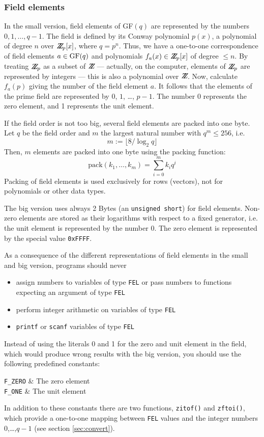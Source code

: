 {\subsubsection{Field elements}\label{sec:fel}
In the small version, field elements of GF$(q)$ are represented
by the numbers $0,1,\ldots,q-1$. The field is defined by its
Conway polynomial $p(x)$, a polynomial of degree $n$ over $Z\!\!\! Z\!_p[x]$,
where $q=p^n$. Thus, we have a one-to-one correspondence of field
elements $a\in{\rm GF}(q)$ and polynomials $f_a(x)\in Z\!\!\! Z\!_p[x]$ of
degree $\leq n$. By treating $Z\!\!\! Z\!_p$ as a subset of $Z\!\!\! Z\!$ ---
actually, on the computer, elements of $Z\!\!\! Z\!_p$ are represented
by integers --- this is also a polynomial over $Z\!\!\! Z\!$. Now,
calculate $f_a(p)$ giving the number of the field element $a$.
It follows that the elements of the prime field are represented by
$0$, $1$, \ldots, $p-1$. The number 0 represents the zero element,
and 1 represents the unit element.

If the field order is not too big, several field elements are packed
into one byte. Let $q$ be the field order and $m$ the largest natural
number with $q^m\leq 256$, i.e.
\[
	m := \lfloor 8/\log_2 q \rfloor
\]
Then, $m$ elements are packed into one byte using the
packing function:
\[
	\mbox{pack}(k_1,\ldots,k_m) = \sum_{i=0}^m k_iq^i
\]
Packing of field elements is used exclusively for rows (vectors),
not for polynomials or other data types.

The big version uses always 2 Bytes (an {\tt unsigned short}) for
field elements. Non-zero elements are stored as their logarithms with
respect to a fixed generator, i.e. the unit element is represented by
the number 0. The zero element is represented by
the special value {\tt 0xFFFF}.

As a consequence of the different representations of field elements
in the small and big version, programs should never
\begin{itemize}
\item	assign numbers to variables of type {\tt FEL} or pass numbers
        to functions expecting an argument of type {\tt FEL}
\item	perform integer arithmetic on variables of type {\tt FEL}
\item	{\tt printf} or {\tt scanf} variables of type {\tt FEL}
\end{itemize}
Instead of using the literals 0 and 1 for the zero and unit element in
the field, which would produce wrong results with the big version,
you should use the following predefined constants:
\begin{center}
\TABlp
\verb|F_ZERO| & The zero element \\
\verb|F_ONE| & The unit element
\eTAB
\end{center}
In addition to these constants there are two functions,
{\tt zitof()} and {\tt zftoi()}, which provide a one-to-one mapping
between {\tt FEL} values and the integer numbers 0,\ldots,$q-1$
(see section \ref{sec:convert}).



}
